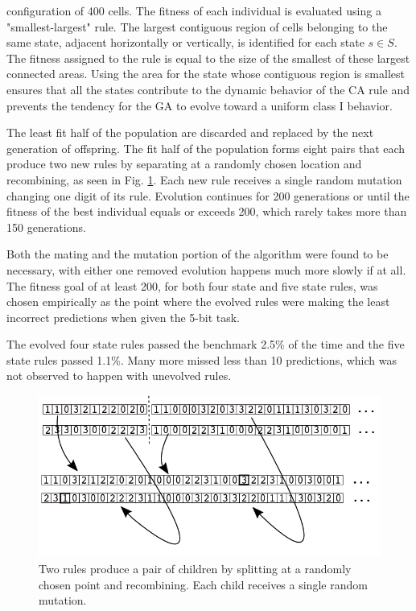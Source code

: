 \documentclass{elsarticle}
\begin{document}
\begin{multicols}{2}
           configuration of 400 cells.  The fitness of each individual is 
           evaluated using a "smallest-largest" rule.  The largest contiguous 
           region of cells belonging to the same state, adjacent horizontally 
           or vertically, is identified for each state $s \in S$. The fitness 
           assigned to the rule is equal to the size of the smallest of these 
           largest connected areas. Using the area for the state whose 
           contiguous region is smallest ensures that all the states contribute 
           to the dynamic behavior of the CA rule and prevents the tendency for 
           the GA to evolve toward a uniform class I behavior.  \par The least 
           fit half of the population are discarded and replaced by the next 
           generation of offspring.  The fit half of the population forms eight 
           pairs that each produce two new rules by separating at a randomly 
           chosen location and recombining, as seen in Fig. \ref{GA}. Each new 
           rule receives a single random mutation changing one digit of its 
           rule.  Evolution continues for 200 generations or until the fitness 
           of the best individual equals or exceeds 200, which rarely takes 
           more than 150 generations.  \par Both the mating and the mutation 
           portion of the algorithm were found to be necessary, with either one 
           removed evolution happens much more slowly if at all. The fitness 
           goal of at least 200, for both four state and five state rules, was 
           chosen empirically as the point where the evolved rules were making 
           the least incorrect predictions when given the 5-bit task. \par
     The evolved four state rules passed the benchmark 2.5\% of the time and 
     the five state rules passed 1.1\%. Many more missed less than 10 
     predictions, which was not observed to happen with unevolved rules.




\begin{figure}[H]
  \centering
    \includegraphics[width=\linewidth]{GA.png}
  \caption{Two rules produce a pair of children by splitting at a randomly 
      chosen point and recombining. Each child receives a single random 
          mutation.}
  \label{GA}
  \end{figure}


\end{multicols}
\end{document}
